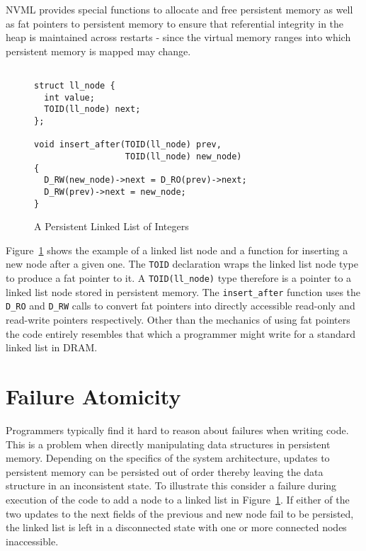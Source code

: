 \documentclass[twocolumn]{article}
\begin{document}
NVML provides special functions to allocate and free persistent memory as well
as fat pointers to persistent memory to ensure that referential integrity in the
heap is maintained across restarts - since the virtual memory ranges into which
persistent memory is mapped may change.

\begin{figure}
{\scriptsize
\begin{verbatim}

struct ll_node {
  int value;
  TOID(ll_node) next;
};

void insert_after(TOID(ll_node) prev, 
                  TOID(ll_node) new_node)
{
  D_RW(new_node)->next = D_RO(prev)->next;
  D_RW(prev)->next = new_node;
}

\end{verbatim}
}
\caption{A Persistent Linked List of Integers}
\label{fig:example}
\end{figure}

Figure~\ref{fig:example} shows the example of a linked list node and a function
for inserting a new node after a given one. The {\tt TOID} declaration wraps the
linked list node type to produce a fat pointer to it. A {\tt TOID(ll\_node)}
type therefore is a pointer to a linked list node stored in persistent memory.
The {\tt insert\_after} function uses the {\tt D\_RO} and {\tt D\_RW} calls to
convert fat pointers into directly accessible read-only and read-write pointers
respectively. Other than the mechanics of using fat pointers the code entirely
resembles that which a programmer might write for a standard linked list in
DRAM.

\section{Failure Atomicity}
Programmers typically find it hard to reason about failures when writing
code. This is a problem when directly manipulating data structures in persistent
memory. Depending on the specifics of the system architecture, updates to
persistent memory can be persisted out of order thereby leaving the data
structure in an inconsistent state. To illustrate this consider a failure during
execution of the code to add a node to a linked list in
Figure~\ref{fig:example}. If either of the two updates to the next fields of the
previous and new node fail to be persisted, the linked list is left in a
disconnected state with one or more connected nodes inaccessible.
\end{document}
